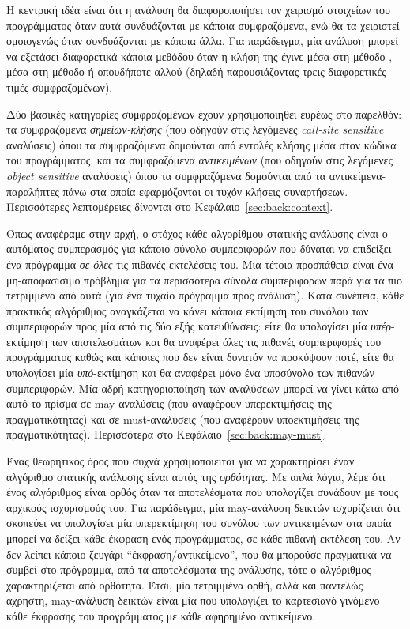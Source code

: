 Η κεντρική ιδέα είναι ότι η ανάλυση θα διαφοροποιήσει τον χειρισμό στοιχείων του προγράμματος όταν αυτά συνδυάζονται με κάποια συμφραζόμενα, ενώ θα τα χειριστεί ομοιογενώς όταν συνδυάζονται με κάποια άλλα. Για παράδειγμα, μία ανάλυση μπορεί να εξετάσει διαφορετικά κάποια μεθόδου όταν η κλήση της έγινε μέσα στη μέθοδο , μέσα στη μέθοδο  ή οπουδήποτε αλλού (δηλαδή παρουσιάζοντας τρεις διαφορετικές τιμές συμφραζομένων).

Δύο βασικές κατηγορίες συμφραζομένων έχουν χρησιμοποιηθεί ευρέως στο παρελθόν: τα συμφραζόμενα \emph{σημείων-κλήσης} (που οδηγούν στις λεγόμενες {\en \emph{call-site sensitive}} αναλύσεις) όπου τα συμφραζόμενα δομούνται από εντολές κλήσης μέσα στον κώδικα του προγράμματος, και τα συμφραζόμενα \emph{αντικειμένων} (που οδηγούν στις λεγόμενες {\en \emph{object sensitive}} αναλύσεις) όπου τα συμφραζόμενα δομούνται από τα αντικείμενα-παραλήπτες πάνω στα οποία εφαρμόζονται οι τυχόν κλήσεις συναρτήσεων. Περισσότερες λεπτομέρειες δίνονται στο Κεφάλαιο~\ref{sec:back:context}.


Όπως αναφέραμε στην αρχή, ο στόχος κάθε αλγορίθμου στατικής ανάλυσης είναι ο αυτόματος συμπερασμός για κάποιο σύνολο συμπεριφορών που δύναται να επιδείξει ένα πρόγραμμα \emph{σε όλες} τις πιθανές εκτελέσεις του. Μια τέτοια προσπάθεια είναι ένα μη-αποφασίσιμο πρόβλημα για τα περισσότερα σύνολα συμπεριφορών παρά για τα πιο τετριμμένα από αυτά (για ένα τυχαίο πρόγραμμα προς ανάλυση). Κατά συνέπεια, κάθε πρακτικός αλγόριθμος αναγκάζεται να κάνει κάποια εκτίμηση του συνόλου των συμπεριφορών προς μία από τις δύο εξής κατευθύνσεις: είτε θα υπολογίσει μία \emph{υπέρ}-εκτίμηση των αποτελεσμάτων και θα αναφέρει όλες τις πιθανές συμπεριφορές του προγράμματος καθώς και κάποιες που δεν είναι δυνατόν να προκύψουν ποτέ, είτε θα υπολογίσει μία \emph{υπό}-εκτίμηση και θα αναφέρει μόνο ένα υποσύνολο των πιθανών συμπεριφορών. Μία αδρή κατηγοριοποίηση των αναλύσεων μπορεί να γίνει κάτω από αυτό το πρίσμα σε {\en may}-αναλύσεις (που αναφέρουν υπερεκτιμήσεις της πραγματικότητας) και σε {\en must}-αναλύσεις (που αναφέρουν υποεκτιμήσεις της πραγματικότητας). Περισσότερα στο Κεφάλαιο~\ref{sec:back:may-must}.


Ένας θεωρητικός όρος που συχνά χρησιμοποιείται για να χαρακτηρίσει έναν αλγόριθμο στατικής ανάλυσης είναι αυτός της \emph{ορθότητας}. Με απλά λόγια, λέμε ότι ένας αλγόριθμος είναι ορθός όταν τα αποτελέσματα που υπολογίζει συνάδουν με τους αρχικούς ισχυρισμούς του. Για παράδειγμα, μία {\en may}-ανάλυση δεικτών ισχυρίζεται ότι σκοπεύει να υπολογίσει μία υπερεκτίμηση του συνόλου των αντικειμένων στα οποία μπορεί να δείξει κάθε έκφραση ενός προγράμματος, σε κάθε πιθανή εκτέλεση του. Αν δεν λείπει κάποιο ζευγάρι ``έκφραση/αντικείμενο'', που θα μπορούσε πραγματικά να συμβεί στο πρόγραμμα, από τα αποτελέσματα της ανάλυσης, τότε ο αλγόριθμος χαρακτηρίζεται από ορθότητα. Έτσι, μία τετριμμένα ορθή, αλλά και παντελώς άχρηστη, {\en may}-ανάλυση δεικτών είναι μία που υπολογίζει το καρτεσιανό γινόμενο κάθε έκφρασης του προγράμματος με κάθε αφηρημένο αντικείμενο.

